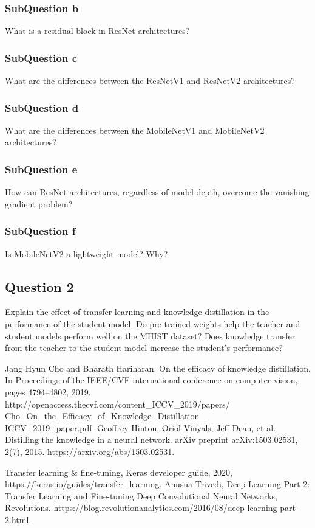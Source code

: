 \documentclass[conference]{IEEEtran}
\begin{document}
\subsubsection{SubQuestion b} What is a residual block in ResNet architectures?
\subsubsection{SubQuestion c} What are the differences between the ResNetV1 and ResNetV2 architectures?
\subsubsection{SubQuestion d} What are the differences between the MobileNetV1 and MobileNetV2 architectures?
\subsubsection{SubQuestion e} How can ResNet architectures, regardless of model depth, overcome the vanishing gradient problem?
\subsubsection{SubQuestion f} Is MobileNetV2 a lightweight model? Why?
\subsection{Question 2} Explain the effect of transfer learning and knowledge distillation in the performance of the student model. Do pre-trained weights help the teacher and student models perform well on the MHIST dataset? Does knowledge transfer from the teacher to the student model increase the student’s performance?

\begin{thebibliography}{00}


 Jang Hyun Cho and Bharath Hariharan. On the efficacy of knowledge distillation. In Proceedings of the IEEE/CVF international conference on computer vision, pages 4794–4802, 2019. http://openaccess.thecvf.com/content\_ICCV\_2019/papers/\\Cho\_On\_the\_Efficacy\_of\_Knowledge\_Distillation\_\\ICCV\_2019\_paper.pdf.
 Geoffrey Hinton, Oriol Vinyals, Jeff Dean, et al. Distilling the knowledge in a neural network. arXiv preprint arXiv:1503.02531, 2(7), 2015. https://arxiv.org/abs/1503.02531.


 Transfer learning \& fine-tuning, Keras developer guide, 2020, https://keras.io/guides/transfer\_learning.
 Anusua Trivedi, Deep Learning Part 2: Transfer Learning and Fine-tuning Deep Convolutional Neural Networks, Revolutions. https://blog.revolutionanalytics.com/2016/08/deep-learning-part-2.html.
\end{thebibliography}
\end{document}
